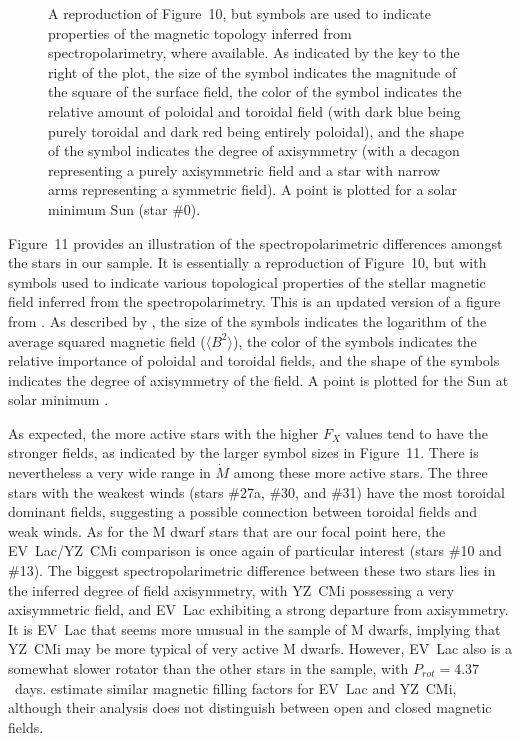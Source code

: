 \documentclass[preprint]{aastex}
\begin{document}
\begin{figure}[t]
\caption{A reproduction of Figure~10, but symbols are used to indicate
  properties of the magnetic topology inferred from spectropolarimetry,
  where available.  As indicated by the key to the right of the plot,
  the size of the symbol indicates the magnitude of the square of the
  surface field, the color of the symbol indicates the relative amount
  of poloidal and toroidal field (with dark blue being purely toroidal
  and dark red being entirely poloidal), and the shape of the symbol
  indicates the degree of axisymmetry (with a decagon representing a
  purely axisymmetric field and a star with narrow arms representing a
  symmetric field).  A point is plotted for a solar minimum Sun (star \#0).}
\end{figure}
     Figure~11 provides an illustration of the spectropolarimetric
differences amongst the stars in our sample.  It is essentially a reproduction
of Figure~10, but with symbols used to indicate various topological properties
of the stellar magnetic field inferred from the spectropolarimetry.  This
is an updated version of a figure from \citet{aav16b}.  As described
by \citet{jd09}, the size of the symbols indicates the
logarithm of the average squared magnetic field ($\langle B^2 \rangle$),
the color of the symbols indicates the relative importance of poloidal
and toroidal fields, and the shape of the symbols indicates the degree
of axisymmetry of the field.  A point is plotted for the Sun at solar minimum
\citep{aav16a}.

     As expected, the more active stars with the higher $F_X$ values tend
to have the stronger fields, as indicated by the larger symbol sizes in
Figure~11.  There is nevertheless a very wide range in $\dot{M}$ among these
more active stars.  The three stars with the weakest winds
(stars \#27a, \#30, and \#31) have the most toroidal dominant
fields, suggesting a possible connection between toroidal fields and
weak winds.  As for the M dwarf stars that are our focal
point here, the EV~Lac/YZ~CMi comparison is once again of particular
interest (stars \#10 and \#13).  The biggest spectropolarimetric 
difference between these two stars lies in the inferred degree of
field axisymmetry, with YZ~CMi possessing a very axisymmetric field, and
EV~Lac exhibiting a strong departure from axisymmetry.  It is EV~Lac that
seems more unusual in the \citet{jm08b} sample of M dwarfs,
implying that YZ~CMi may be more typical of very active M dwarfs.
However, EV~Lac also is a somewhat slower rotator than the other stars
in the sample, with $P_{rot}=4.37$~days.
\citet{vs19} estimate similar magnetic filling factors for
EV~Lac and YZ~CMi, although their analysis does not distinguish between open
and closed magnetic fields.
\end{document}
